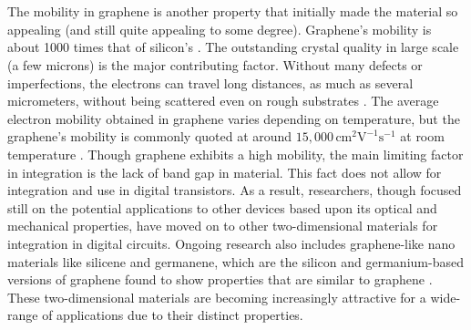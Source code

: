 \documentclass[%
 reprint,
 amsmath,amssymb,
 aps,
pra,
floatfix,
]{revtex4-1}
\begin{document}
\\ \\
The mobility in graphene is another property that initially made the material so appealing (and still quite appealing to some degree). Graphene's mobility is about 1000 times that of silicon's \cite{Dargys1994, 2DflexibleNanoElectronics2014}. The outstanding crystal quality in large scale (a few microns) is the major contributing factor. Without many defects or imperfections, the electrons can travel long distances, as much as several micrometers, without being scattered even on rough substrates \cite{nanoscaleReview2011, Du2008}. The average electron mobility obtained in graphene varies depending on temperature, but the graphene's mobility is commonly quoted at around $15,000\mathrm{\,cm}^2\mathrm{V}^{-1}\mathrm{s}^{-1}$ at room temperature \cite{Novoselov2007}. Though graphene exhibits a high mobility, the main limiting factor in integration is the lack of band gap in material. This fact does not allow for integration and use in digital transistors. As a result, researchers, though focused still on the potential applications to other devices based upon its optical and mechanical properties, have moved on to other two-dimensional materials for integration in digital circuits. Ongoing research also includes graphene-like nano materials like silicene and germanene, which are the silicon and germanium-based versions of graphene found to show properties that are similar to graphene \cite{Takeda1994, Cahangirov2009}. These two-dimensional materials are becoming increasingly attractive for a wide-range of applications due to their distinct properties.
\end{document}
